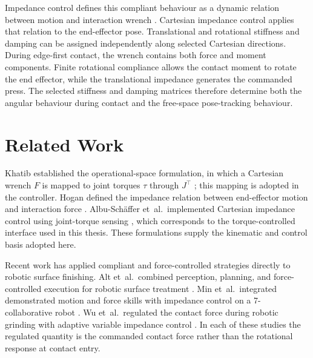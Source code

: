 Impedance control defines this compliant behaviour as a dynamic relation between
motion and interaction wrench \mbox{\citep{Hogan1985}}. Cartesian impedance control
applies that relation to the end-effector pose. Translational and
rotational stiffness and damping can be assigned independently along selected
Cartesian directions. During edge-first contact, the wrench contains both force and
moment components. Finite rotational compliance allows the contact moment to
rotate the end effector, while the translational impedance generates the
commanded press. The selected stiffness and damping
matrices therefore determine both the angular behaviour during contact and
the free-space pose-tracking behaviour.

\section{Related Work}

 Khatib established the operational-space formulation, in
which a Cartesian wrench \mbox{\(F\)} is mapped to joint torques \mbox{\(\tau\)} through
\mbox{\(J^\top\)}
\mbox{\citep{Khatib1987}}; this mapping is adopted in the controller. Hogan defined
the impedance relation between end-effector motion and interaction force
\mbox{\citep{Hogan1985}}. Albu-Sch\"affer \mbox{et al.\ }implemented Cartesian impedance
control using joint-torque sensing \mbox{\citep{Albu2003}}, which corresponds to the
torque-controlled interface used in this thesis. These formulations supply the
kinematic and control basis adopted here.


Recent work has applied compliant and force-controlled strategies directly to
robotic surface finishing. Alt \mbox{et al.\ }combined perception, planning, and
force-controlled execution for robotic surface treatment
\mbox{\citep{Alt2024RoboGrind}}. Min \mbox{et al.\ }integrated demonstrated motion and
force skills with impedance control on a 7-\mbox{} collaborative robot
\mbox{\citep{Min2024HumanSkillsForceControl}}. Wu \mbox{et al.\ }regulated the
contact force during robotic grinding with adaptive variable impedance control
\mbox{\citep{Wu2023DualPIDImpedance}}. In each of these studies the regulated
quantity is the commanded contact force rather than the rotational response at
contact entry.

